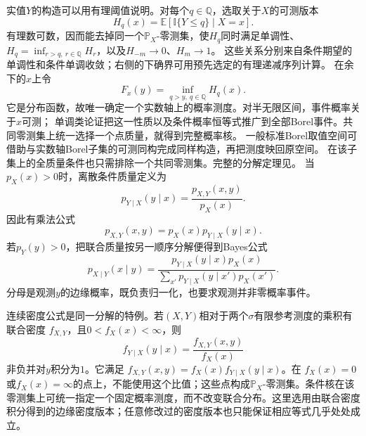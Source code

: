 实值\(Y\)的构造可以用有理阈值说明。对每个\(q\in\mathbb Q\)，选取关于\(X\)的可测版本
\[ H_q(x)=\mathbb E[\mathbb I\{Y\leq q\}\mid X=x]. \]
有理数可数，因而能去掉同一个\(\mathbb P_X\)-零测集，使\(H_q\)同时满足单调性、
\(H_q=\inf_{r>q,\ r\in\mathbb Q}H_r\)，以及\(H_{-m}\to0\)、\(H_m\to1\)。
这些关系分别来自条件期望的单调性和条件单调收敛；右侧的下确界可用预先选定的有理递减序列计算。
在余下的\(x\)上令
\[ F_x(y)=\inf_{q>y,\ q\in\mathbb Q}H_q(x). \]
它是分布函数，故唯一确定一个实数轴上的概率测度。对半无限区间，事件概率关于\(x\)可测；
单调类论证把这一性质以及条件概率恒等式推广到全部Borel事件。共同零测集上统一选择一个点质量，就得到完整概率核。
一般标准Borel取值空间可借助与实数轴Borel子集的可测同构完成同样构造，再把测度映回原空间。
在该子集上的全质量条件也只需排除一个共同零测集。完整的分解定理见。
当\(p_X(x)>0\)时，离散条件质量定义为
\[ p_{Y\mid X}(y\mid x)
  =\frac{p_{X,Y}(x,y)}{p_X(x)}. \]
因此有乘法公式
\[ p_{X,Y}(x,y)=p_X(x)p_{Y\mid X}(y\mid x). \]
若\(p_Y(y)>0\)，把联合质量按另一顺序分解便得到Bayes公式
\begin{equation}
  p_{X\mid Y}(x\mid y)
  =
  \frac{p_{Y\mid X}(y\mid x)p_X(x)}
       {\sum_{x'}p_{Y\mid X}(y\mid x')p_X(x')}.
  \label{eq:probability-discrete-bayes}
\end{equation}
分母是观测\(y\)的边缘概率，既负责归一化，也要求观测并非零概率事件。

连续密度公式是同一分解的特例。若\((X,Y)\)相对于两个\(\sigma\)有限参考测度的乘积有联合密度
\(f_{X,Y}\)，且\(0<f_X(x)<\infty\)，则
\[
  f_{Y\mid X}(y\mid x)
  =\frac{f_{X,Y}(x,y)}{f_X(x)}
\]
非负并对\(y\)积分为\(1\)。它满足
\(f_{X,Y}(x,y)=f_X(x)f_{Y\mid X}(y\mid x)\)。在
\(f_X(x)=0\)或\(f_X(x)=\infty\)的点上，不能使用这个比值；这些点构成\(\mathbb P_X\)-零测集。条件核在该零测集上可统一指定一个固定概率测度，而不改变联合分布。这里选用由联合密度积分得到的边缘密度版本；任意修改过的密度版本也只能保证相应等式几乎处处成立。

